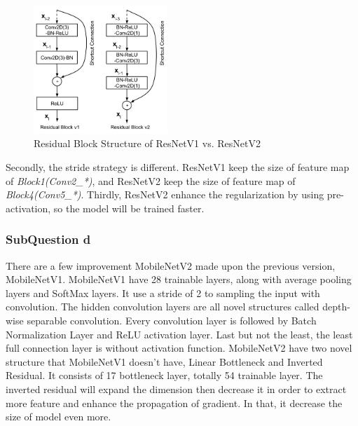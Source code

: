 \documentclass[conference]{IEEEtran}
\begin{document}
\begin{figure}[h] 
    \centering
    \includegraphics[width=0.45\textwidth]{./graphs/Task2/v1v2.png}
    \caption{Residual Block Structure of ResNetV1 vs. ResNetV2}
    \label{resv1v2}
\end{figure}

Secondly, the stride strategy is different. ResNetV1 keep the size of feature map of \textit{Block1(Conv2\_*)}, and ResNetV2 keep the size of feature map of \textit{Block4(Conv5\_*)}. Thirdly, ResNetV2 enhance the regularization by using pre-activation, so the model will be trained faster.

\subsubsection{SubQuestion d} %

There are a few improvement MobileNetV2 made upon the previous version, MobileNetV1. MobileNetV1 have 28 trainable layers, along with average pooling layers and SoftMax layers. It use a stride of 2 to sampling the input with convolution. The hidden convolution layers are all novel structures called depth-wise separable convolution. Every convolution layer is followed by Batch Normalization Layer and ReLU activation layer. Last but not the least, the least full connection layer is without activation function.
MobileNetV2 have two novel structure that MobileNetV1 doesn't have, Linear Bottleneck and Inverted Residual. It consists of 17 bottleneck layer, totally 54 trainable layer. The inverted residual will expand the dimension then decrease it in order to extract more feature and enhance the propagation of gradient. In that, it decrease the size of model even more.
\end{document}
